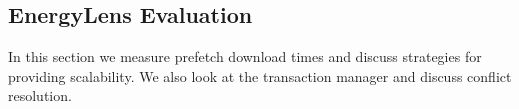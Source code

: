 





\subsection{EnergyLens Evaluation}
\label{sec:eval}


In this section we measure prefetch download times and discuss strategies for providing scalability.  We also
look at the transaction manager and discuss conflict resolution.

